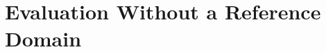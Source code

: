 \documentclass[letterpaper]{article} %
\newcommand{\realm}{{\ensuremath{M^*}}\xspace}
\newif\ifaddcomments
\newcommand{\roni}[1]{\ifaddcomments{\textcolor{red}{[Roni: #1]}}\fi}
\newcommand{\gregor}[1]{\ifaddcomments{\textcolor{orange}{[Gregor: #1]}}\fi}
\begin{document}
\section{Evaluation Without a Reference Domain}
\label{sec:metrics}
\end{document}
